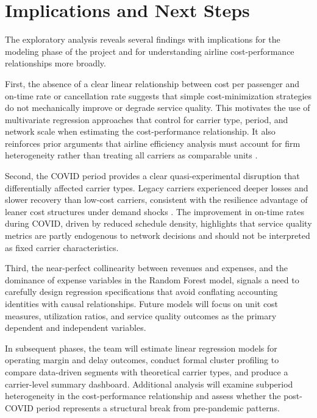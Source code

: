 \documentclass[11pt, letterpaper]{article}
\begin{document}
\section{Implications and Next Steps}

The exploratory analysis reveals several findings with implications for the modeling phase of the project and for understanding airline cost-performance relationships more broadly.

First, the absence of a clear linear relationship between cost per passenger and on-time rate or cancellation rate suggests that simple cost-minimization strategies do not mechanically improve or degrade service quality. This motivates the use of multivariate regression approaches that control for carrier type, period, and network scale when estimating the cost-performance relationship. It also reinforces prior arguments that airline efficiency analysis must account for firm heterogeneity rather than treating all carriers as comparable units \cite{li2025}.

Second, the COVID period provides a clear quasi-experimental disruption that differentially affected carrier types. Legacy carriers experienced deeper losses and slower recovery than low-cost carriers, consistent with the resilience advantage of leaner cost structures under demand shocks \cite{fontanet2022}. The improvement in on-time rates during COVID, driven by reduced schedule density, highlights that service quality metrics are partly endogenous to network decisions and should not be interpreted as fixed carrier characteristics.

Third, the near-perfect collinearity between revenues and expenses, and the dominance of expense variables in the Random Forest model, signals a need to carefully design regression specifications that avoid conflating accounting identities with causal relationships. Future models will focus on unit cost measures, utilization ratios, and service quality outcomes as the primary dependent and independent variables.

In subsequent phases, the team will estimate linear regression models for operating margin and delay outcomes, conduct formal cluster profiling to compare data-driven segments with theoretical carrier types, and produce a carrier-level summary dashboard. Additional analysis will examine subperiod heterogeneity in the cost-performance relationship and assess whether the post-COVID period represents a structural break from pre-pandemic patterns.



\end{document}
